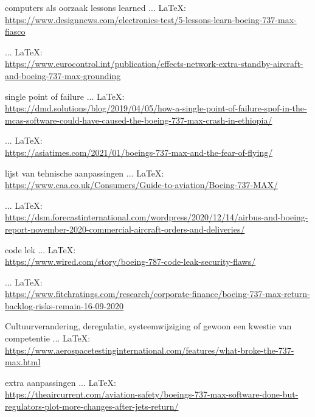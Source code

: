 \begin{thebibliography}{99}
{{{{{{{    computers als oorzaak
    lessons learned
     ... \LaTeX:\\ \url{https://www.designnews.com/electronics-test/5-lessons-learn-boeing-737-max-fiasco}
    
     ... \LaTeX:\\ \url{https://www.eurocontrol.int/publication/effects-network-extra-standby-aircraft-and-boeing-737-max-grounding}
    
    single point of failure
     ... \LaTeX:\\ \url{https://dmd.solutions/blog/2019/04/05/how-a-single-point-of-failure-spof-in-the-mcas-software-could-have-caused-the-boeing-737-max-crash-in-ethiopia/}
    
    
     ... \LaTeX:\\ \url{https://asiatimes.com/2021/01/boeings-737-max-and-the-fear-of-flying/}
    
    lijst van tehnische aanpassingen
     ... \LaTeX:\\ \url{https://www.caa.co.uk/Consumers/Guide-to-aviation/Boeing-737-MAX/}
    
     ... \LaTeX:\\ \url{https://dsm.forecastinternational.com/wordpress/2020/12/14/airbus-and-boeing-report-november-2020-commercial-aircraft-orders-and-deliveries/}
    
    code lek
     ... \LaTeX:\\ \url{https://www.wired.com/story/boeing-787-code-leak-security-flaws/}
    
     ... \LaTeX:\\ \url{https://www.fitchratings.com/research/corporate-finance/boeing-737-max-return-backlog-risks-remain-16-09-2020}
    
    Cultuurverandering, deregulatie, systeemwijziging of gewoon een kwestie van competentie
     ... \LaTeX:\\ \url{https://www.aerospacetestinginternational.com/features/what-broke-the-737-max.html}
    
    extra aanpassingen
     ... \LaTeX:\\ \url{https://theaircurrent.com/aviation-safety/boeings-737-max-software-done-but-regulators-plot-more-changes-after-jets-return/}
    
}}}}}}}
\end{thebibliography}
